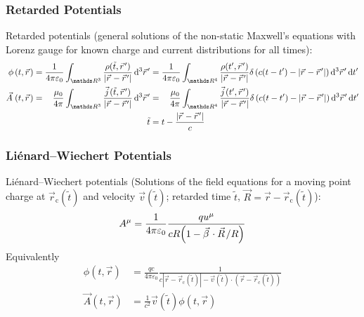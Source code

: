 		\subsubsection{Retarded Potentials}
			\label{Sec:RetardedPotentials}
			\noindent
			Retarded potentials (general solutions of the non-static Maxwell's equations with Lorenz gauge for known charge and current distributions for all times):
			\begin{equation}
				\begin{aligned}
					\phi\left(t,\vec{r}\right)
					= \frac{1}{4\pi\varepsilon_0} \int_{\reals ^3} \frac{\rho(\tilde{t},\vec{r}')}{\left|\vec{r}-\vec{r}'\right|}\dd[3]{\vec{r}'}
					&=	\frac{1}{4\pi\varepsilon_0} \int_{\reals ^4} \frac{\rho(t',\vec{r}')}{\left|\vec{r}-\vec{r}'\right|}\delta\left( c(t-t')-\left|\vec{r}-\vec{r}'\right|\right)\dd[3]{\vec{r}'}\dd t' \\
					\vec{A}\left(t,\vec{r}\right)
					= \phantom{\varepsilon_0} \frac{\mu_0}{4\pi} \int_{\reals ^3} \frac{\vec{j}(\tilde{t},\vec{r}')}{\left|\vec{r}-\vec{r}'\right|}\dd[3]{\vec{r}'}
					&=	\phantom{\varepsilon_0} \frac{\mu_0}{4\pi} \int_{\reals ^4} \frac{\vec{j}(t',\vec{r}')}{\left|\vec{r}-\vec{r}'\right|}\delta\left( c(t-t')-\left|\vec{r}-\vec{r}'\right|\right)\dd[3]{\vec{r}'}\dd t' \\
					\tilde{t}&=t-\frac{\left|\vec{r}-\vec{r}'\right|}{c}
				\end{aligned}
			\end{equation}

		\subsubsection{Liénard--Wiechert Potentials}
			\noindent
			Liénard--Wiechert potentials (Solutions of the field equations for a moving point charge at $\vec{r}_\text{c}(\tilde{t})$ and velocity $\vec{v}(\tilde{t})$; retarded time $\tilde{t}$, $\vec{R}= \vec{r}-\vec{r}_\text{c}(\tilde{t})$):
			\begin{equation}
				A^\mu = \frac{1}{4\pi\varepsilon_0} \frac{q u^\mu}{c R \qty(1 - \vec{\beta}\cdot\vec{R}/R) }
			\end{equation}
			Equivalently
			\begin{equation}
				\begin{aligned}
					\phi(t,\vec{r}) & =\frac{q c}{4\pi \varepsilon_0}\frac{1}{c \left|\vec{r}-\vec{r}_\text{c}(\tilde{t})\right|-\vec{v}(\tilde{t})\cdot\left(\vec{r}-\vec{r}_\text{c}(\tilde{t})\right)} \\
					\vec{A}(t,\vec{r}) &= \frac{1}{c^2}\vec{v}(\tilde{t})\phi(t,\vec{r}) \\
				\end{aligned}
			\end{equation}

